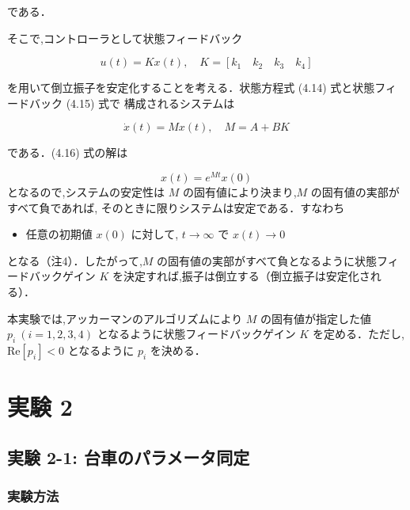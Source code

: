 である．

そこで,コントローラとして状態フィードバック

\[
  u(t) = Kx(t), \quad K = [k_1 \quad k_2 \quad k_3 \quad k_4] \tag{4.15}
\]

を用いて倒立振子を安定化することを考える．状態方程式 (4.14) 式と状態フィードバック (4.15) 式で
構成されるシステムは

\[
  \dot{x}(t) = Mx(t), \quad M = A + BK \tag{4.16}
\]

である．(4.16) 式の解は

\[
  x(t) = e^{Mt}x(0) \tag{4.17}
\]
となるので,システムの安定性は \( M \) の固有値により決まり,\( M \) の固有値の実部がすべて負であれば,
そのときに限りシステムは安定である．すなわち

\begin{itemize}
  \item 任意の初期値 \( x(0) \) に対して, \( t \to \infty \) で \( x(t) \to 0 \)
\end{itemize}

となる（注4）．したがって,\( M \) の固有値の実部がすべて負となるように状態フィードバックゲイン \( K \) 
を決定すれば,振子は倒立する（倒立振子は安定化される）．

本実験では,アッカーマンのアルゴリズムにより \( M \) の固有値が指定した値 \( p_i \ (i=1,2,3,4) \) 
となるように状態フィードバックゲイン \( K \) を定める．ただし,\( \text{Re}[p_i] < 0 \) となるように
\( p_i \) を決める．

\section{実験 2}
\subsection{実験 2-1: 台車のパラメータ同定}
\subsubsection{実験方法}

